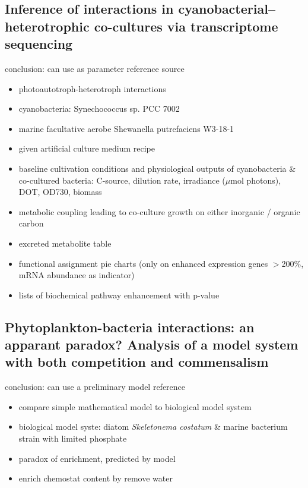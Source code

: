 \documentclass[a4paper,11pt]{article}
\begin{document}
    \subsection{Inference of interactions in cyanobacterial– heterotrophic co-cultures via transcriptome sequencing\autocite{beliaev2014inference}}
    conclusion: can use as parameter reference source
    \begin{itemize}
        \item photoautotroph-heterotroph interactions
        \item cyanobacteria: Synechococcus sp. PCC 7002
        \item marine facultative aerobe Shewanella putrefaciens W3-18-1
        \item given artificial culture medium recipe
        \item baseline cultivation conditions and physiological outputs of cyanobacteria \& co-cultured bacteria: C-source, dilution rate, irradiance ($\mu$mol photons), DOT, OD730, biomass
        \item metabolic coupling leading to co-culture growth on either inorganic / organic carbon
        \item excreted metabolite table
        \item functional assignment pie charts (only on enhanced expression genes $>$200\%, mRNA abundance as indicator)
        \item lists of biochemical pathway enhancement with p-value
    \end{itemize}
    
    \subsection{Phytoplankton-bacteria interactions: an apparant paradox? Analysis of a model system with both competition and commensalism\autocite{bratbak1985phytoplankton}}
    conclusion: can use a preliminary model reference
    \begin{itemize}
        \item compare simple mathematical model to biological model system
        \item biological model syste: diatom \textit{Skeletonema costatum} \& marine bacterium strain with limited phosphate
        \item paradox of enrichment, predicted by model
        \item enrich chemostat content by remove water
    \end{itemize}
    
\end{document}
